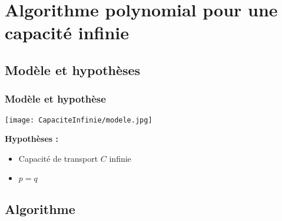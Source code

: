\section{Algorithme polynomial pour une capacité infinie}

\subsection{Modèle et hypothèses}

\begin{frame}[label=CapaciteInfinie]
  \frametitle{Modèle et hypothèse}
  
  \begin{center}
  
    \begin{minipage}[c]{.5\linewidth}
      \begin{center}
        \texttt{[image: CapaciteInfinie/modele.jpg]}
      \end{center}
    \end{minipage}\hfill
    \begin{minipage}[c]{.5\linewidth}
      \textbf{Hypothèses :}
      \begin{itemize}
      \item Capacité de transport $C$ infinie
      \item $p=q$
      \end{itemize}
    \end{minipage}
    
  \end{center}

\end{frame}

\subsection{Algorithme}

